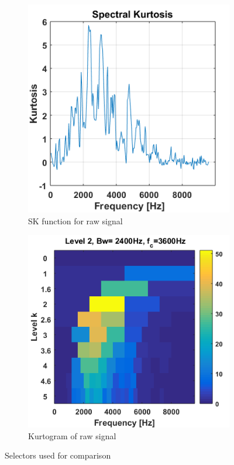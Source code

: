 \documentclass[preprint,12pt]{elsarticle}
\begin{document}
\begin{figure}[!ht]
  \centering
  \begin{subfigure}[b]{0.46\textwidth}
      \centering
      \includegraphics[width=\textwidth]{wykresy/SK}
      \caption{SK function for raw signal}
      \label{fig:SK}
  \end{subfigure}
  \begin{subfigure}[b]{0.5\textwidth}
      \centering
		\includegraphics[width=\textwidth]{wykresy/kurtogram}
        \caption{Kurtogram of raw signal}
    \label{fig:kurtogram}
  \end{subfigure}
  \vspace{-5pt}
  \caption{Selectors used for comparison}
  \label{fig:comps}
\end{figure}
\end{document}
